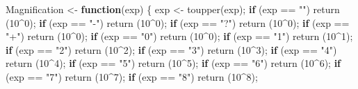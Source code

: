 \documentclass[
]{article}
\newenvironment{Shaded}{\begin{snugshade}}{\end{snugshade}}
\newcommand{\ControlFlowTok}[1]{\textcolor[rgb]{0.13,0.29,0.53}{\textbf{#1}}}
\newcommand{\DecValTok}[1]{\textcolor[rgb]{0.00,0.00,0.81}{#1}}
\newcommand{\FunctionTok}[1]{\textcolor[rgb]{0.00,0.00,0.00}{#1}}
\newcommand{\NormalTok}[1]{#1}
\newcommand{\OtherTok}[1]{\textcolor[rgb]{0.56,0.35,0.01}{#1}}
\newcommand{\SpecialCharTok}[1]{\textcolor[rgb]{0.00,0.00,0.00}{#1}}
\newcommand{\StringTok}[1]{\textcolor[rgb]{0.31,0.60,0.02}{#1}}
\begin{document}
\begin{Shaded}
\begin{Highlighting}[]
\NormalTok{Magnification }\OtherTok{\textless{}{-}} \ControlFlowTok{function}\NormalTok{(exp) \{}
\NormalTok{    exp }\OtherTok{\textless{}{-}} \FunctionTok{toupper}\NormalTok{(exp);}
    \ControlFlowTok{if}\NormalTok{ (exp }\SpecialCharTok{==} \StringTok{""}\NormalTok{)  }\FunctionTok{return}\NormalTok{ (}\DecValTok{10}\SpecialCharTok{\^{}}\DecValTok{0}\NormalTok{);}
    \ControlFlowTok{if}\NormalTok{ (exp }\SpecialCharTok{==} \StringTok{"{-}"}\NormalTok{) }\FunctionTok{return}\NormalTok{ (}\DecValTok{10}\SpecialCharTok{\^{}}\DecValTok{0}\NormalTok{);}
    \ControlFlowTok{if}\NormalTok{ (exp }\SpecialCharTok{==} \StringTok{"?"}\NormalTok{) }\FunctionTok{return}\NormalTok{ (}\DecValTok{10}\SpecialCharTok{\^{}}\DecValTok{0}\NormalTok{);}
    \ControlFlowTok{if}\NormalTok{ (exp }\SpecialCharTok{==} \StringTok{"+"}\NormalTok{) }\FunctionTok{return}\NormalTok{ (}\DecValTok{10}\SpecialCharTok{\^{}}\DecValTok{0}\NormalTok{);}
    \ControlFlowTok{if}\NormalTok{ (exp }\SpecialCharTok{==} \StringTok{"0"}\NormalTok{) }\FunctionTok{return}\NormalTok{ (}\DecValTok{10}\SpecialCharTok{\^{}}\DecValTok{0}\NormalTok{);}
    \ControlFlowTok{if}\NormalTok{ (exp }\SpecialCharTok{==} \StringTok{"1"}\NormalTok{) }\FunctionTok{return}\NormalTok{ (}\DecValTok{10}\SpecialCharTok{\^{}}\DecValTok{1}\NormalTok{);}
    \ControlFlowTok{if}\NormalTok{ (exp }\SpecialCharTok{==} \StringTok{"2"}\NormalTok{) }\FunctionTok{return}\NormalTok{ (}\DecValTok{10}\SpecialCharTok{\^{}}\DecValTok{2}\NormalTok{);}
    \ControlFlowTok{if}\NormalTok{ (exp }\SpecialCharTok{==} \StringTok{"3"}\NormalTok{) }\FunctionTok{return}\NormalTok{ (}\DecValTok{10}\SpecialCharTok{\^{}}\DecValTok{3}\NormalTok{);}
    \ControlFlowTok{if}\NormalTok{ (exp }\SpecialCharTok{==} \StringTok{"4"}\NormalTok{) }\FunctionTok{return}\NormalTok{ (}\DecValTok{10}\SpecialCharTok{\^{}}\DecValTok{4}\NormalTok{);}
    \ControlFlowTok{if}\NormalTok{ (exp }\SpecialCharTok{==} \StringTok{"5"}\NormalTok{) }\FunctionTok{return}\NormalTok{ (}\DecValTok{10}\SpecialCharTok{\^{}}\DecValTok{5}\NormalTok{);}
    \ControlFlowTok{if}\NormalTok{ (exp }\SpecialCharTok{==} \StringTok{"6"}\NormalTok{) }\FunctionTok{return}\NormalTok{ (}\DecValTok{10}\SpecialCharTok{\^{}}\DecValTok{6}\NormalTok{);}
    \ControlFlowTok{if}\NormalTok{ (exp }\SpecialCharTok{==} \StringTok{"7"}\NormalTok{) }\FunctionTok{return}\NormalTok{ (}\DecValTok{10}\SpecialCharTok{\^{}}\DecValTok{7}\NormalTok{);}
    \ControlFlowTok{if}\NormalTok{ (exp }\SpecialCharTok{==} \StringTok{"8"}\NormalTok{) }\FunctionTok{return}\NormalTok{ (}\DecValTok{10}\SpecialCharTok{\^{}}\DecValTok{8}\NormalTok{);}

\end{Highlighting}
\end{Shaded}
\end{document}
